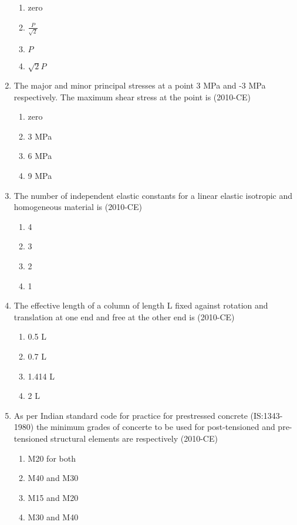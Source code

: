 \documentclass[journal,12pt,twocolumn]{IEEEtran}
\theoremstyle{remark}
\begin{document}
\begin{enumerate}
		 \begin{enumerate}
	\item zero
	\item $\frac{P}{\sqrt{2}}$
	\item $P$
	\item $\sqrt{2}P$

\end{enumerate}

\item The major and minor principal stresses at a point 3 MPa and -3 MPa respectively. The maximum shear stress at the point is \hfill{(2010-CE)}

\begin{enumerate}
	\item zero
		\item 3 MPa
		\item 6 MPa
		\item 9 MPa
\end{enumerate}
	
\item The number of independent elastic constants for a linear elastic isotropic and homogeneous material is \hfill{(2010-CE)}

\begin{enumerate}
	\item 4
	\item 3
	\item 2
	\item 1
\end{enumerate}
			 
\item The effective length of a column of length L fixed against rotation and translation at one end and free at the other end is \hfill{(2010-CE)}

\begin{enumerate}
	\item 0.5 L
\item 0.7 L
\item 1.414 L
\item 2 L

\end{enumerate}

\item As per Indian standard code for practice for prestressed concrete (IS:1343-1980) the minimum grades of concerte to be used for post-tensioned and pre-tensioned structural elements are respectively \hfill{(2010-CE)}

\begin{enumerate}
\item M20 for both
 \item M40 and M30
 \item M15 and M20
 \item M30 and M40
\end{enumerate}



\end{enumerate}
\end{document}
